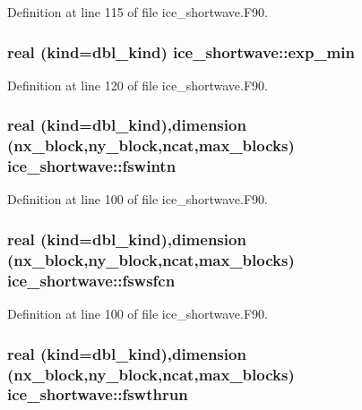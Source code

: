 Definition at line 115 of file ice\_\-shortwave.F90.\hypertarget{namespaceice__shortwave_a55ffdfb6fb5de60880330a142dfb398f}{
\subsubsection[{exp\_\-min}]{\setlength{\rightskip}{0pt plus 5cm}real (kind=dbl\_\-kind) {\bf ice\_\-shortwave::exp\_\-min}}}
\label{namespaceice__shortwave_a55ffdfb6fb5de60880330a142dfb398f}


Definition at line 120 of file ice\_\-shortwave.F90.\hypertarget{namespaceice__shortwave_aeb385ab42b4e03ee1b8cde25541c1e64}{
\subsubsection[{fswintn}]{\setlength{\rightskip}{0pt plus 5cm}real (kind=dbl\_\-kind),dimension (nx\_\-block,ny\_\-block,ncat,max\_\-blocks) {\bf ice\_\-shortwave::fswintn}}}
\label{namespaceice__shortwave_aeb385ab42b4e03ee1b8cde25541c1e64}


Definition at line 100 of file ice\_\-shortwave.F90.\hypertarget{namespaceice__shortwave_a2b2e5ef90cc9c908da7af342c0988e59}{
\subsubsection[{fswsfcn}]{\setlength{\rightskip}{0pt plus 5cm}real (kind=dbl\_\-kind),dimension (nx\_\-block,ny\_\-block,ncat,max\_\-blocks) {\bf ice\_\-shortwave::fswsfcn}}}
\label{namespaceice__shortwave_a2b2e5ef90cc9c908da7af342c0988e59}


Definition at line 100 of file ice\_\-shortwave.F90.\hypertarget{namespaceice__shortwave_a074d77add6f79e715c81aa6b4600bf98}{
\subsubsection[{fswthrun}]{\setlength{\rightskip}{0pt plus 5cm}real (kind=dbl\_\-kind),dimension (nx\_\-block,ny\_\-block,ncat,max\_\-blocks) {\bf ice\_\-shortwave::fswthrun}}}
\label{namespaceice__shortwave_a074d77add6f79e715c81aa6b4600bf98}


